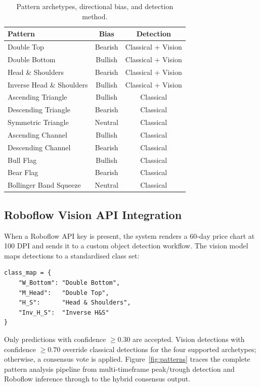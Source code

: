 \documentclass[10pt,a4paper,twoside]{article}
\begin{document}
\begin{table}[htb]
  \begin{center}
    {\caption{Pattern archetypes, directional bias, and detection method.}
    \label{tab:patterns}}
    \begin{tabular}{|l|c|c|}
    \hline
    \textbf{Pattern} & \textbf{Bias} & \textbf{Detection} \\
    \hline
    Double Top & Bearish & Classical + Vision \\
    Double Bottom & Bullish & Classical + Vision \\
    Head \& Shoulders & Bearish & Classical + Vision \\
    Inverse Head \& Shoulders & Bullish & Classical + Vision \\
    Ascending Triangle & Bullish & Classical \\
    Descending Triangle & Bearish & Classical \\
    Symmetric Triangle & Neutral & Classical \\
    Ascending Channel & Bullish & Classical \\
    Descending Channel & Bearish & Classical \\
    Bull Flag & Bullish & Classical \\
    Bear Flag & Bearish & Classical \\
    Bollinger Band Squeeze & Neutral & Classical \\
    \hline
    \end{tabular}
  \end{center}
\end{table}

\subsection{Roboflow Vision API Integration}

When a Roboflow API key is present, the system renders a 60-day price chart at
100 DPI and sends it to a custom object detection workflow. The vision model
maps detections to a standardised class set:
\begin{verbatim}
class_map = {
    "W_Bottom": "Double Bottom",
    "M_Head":   "Double Top",
    "H_S":      "Head & Shoulders",
    "Inv_H_S":  "Inverse H&S"
}
\end{verbatim}
Only predictions with confidence $\geq 0.30$ are accepted. Vision detections
with confidence $\geq 0.70$ override classical detections for the four supported
archetypes; otherwise, a consensus vote is applied. Figure~\ref{fig:patterns}
traces the complete pattern analysis pipeline from multi-timeframe peak/trough
detection and Roboflow inference through to the hybrid consensus output.
\end{document}
